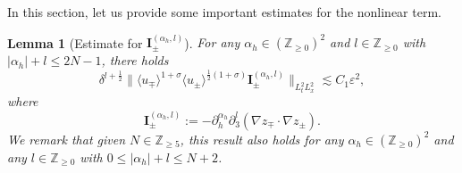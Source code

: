 \documentclass[10pt,reqno]{amsart}
\numberwithin{equation}{section}
\newtheorem{lemma}[theorem]{Lemma}
\begin{document}
In this section, let us provide some important estimates for the nonlinear term.  

 


 

\begin{lemma}[Estimate for $\mathbf{I}_{\pm}^{(\alpha_h,l)}$]\label{lemma1}
For any $\alpha_h\in(\mathbb{Z}_{\geqslant 0})^2$ and $l\in\mathbb{Z}_{\geqslant 0}$ with $|\alpha_h|+l\leqslant 2N-1$, there holds  
\[\delta^{l+\frac{1}{2}}\big\|\langle u_\mp\rangle^{1+\sigma}\langle u_\pm\rangle^{\frac{1}{2}(1+\sigma)}\mathbf{I}_{\pm}^{(\alpha_h,l)}\big\|_{L^2_tL^2_x}\lesssim C_1\varepsilon^2,\]
where \[\mathbf{I}_{\pm}^{(\alpha_h,l)}:=-\partial_h^{\alpha_h}\partial_3^l(\nabla z_\mp\cdot\nabla z_\pm).\]
We remark that given $N\in\mathbb{Z}_{\geqslant 5}$, this result also holds for any $\alpha_h\in(\mathbb{Z}_{\geqslant 0})^2$ and any  $l\in\mathbb{Z}_{\geqslant 0}$ with $0\leqslant|\alpha_h|+l\leqslant N+2$.
\end{lemma}
\end{document}
